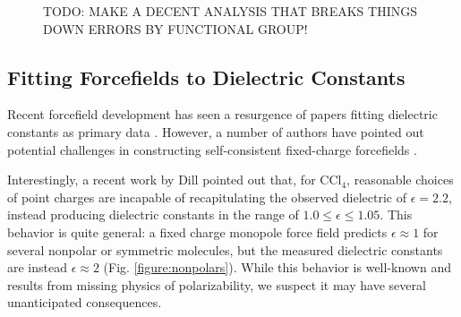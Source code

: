 \documentclass[aps,pre,twocolumn,nofootinbib,superscriptaddress,linenumbers]{revtex4-1}
\begin{document}
\begin{figure}
\caption{TODO: MAKE A DECENT ANALYSIS THAT BREAKS THINGS DOWN ERRORS BY FUNCTIONAL GROUP!
}
\label{figure:ByFunctionalGroup}

\end{figure}



\subsection{Fitting Forcefields to Dielectric Constants}

Recent forcefield development has seen a resurgence of papers fitting dielectric constants as primary data \cite{wang2014building, fennell2014fixed}.  
However, a number of authors have pointed out potential challenges in constructing self-consistent fixed-charge forcefields \cite{fennell2012simple, leontyev2014polarizable}.  


Interestingly, a recent work by Dill \cite{fennell2012simple} pointed out that, for $\mathrm{CCl_4}$, reasonable choices of point charges are incapable of recapitulating the observed dielectric of $\epsilon = 2.2$, instead producing dielectric constants in the range of $1.0 \le \epsilon \le 1.05$.  
This behavior is quite general: a fixed charge monopole force field predicts $\epsilon \approx 1$ for several nonpolar or symmetric molecules, but the measured dielectric constants are instead $\epsilon \approx 2$ (Fig. \ref{figure:nonpolars}).  
While this behavior is well-known and results from missing physics of polarizability, we suspect it may have several unanticipated consequences.

\end{document}
